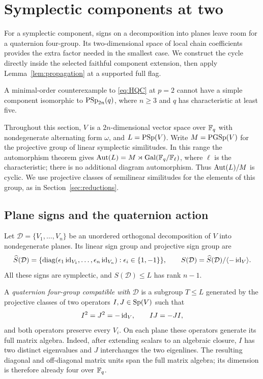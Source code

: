 \section{Symplectic components at two}\label{sec:symplectic}

For a symplectic component, signs on a decomposition into planes leave
room for a quaternion four-group.  Its two-dimensional space of local
chain coefficients provides the extra factor needed in the smallest
case.  We construct the cycle directly inside the selected faithful
component extension, then apply Lemma~\ref{lem:propagation} at a
supported full flag.

\begin{proposition}\label{prop:symplectic}
A minimal-order counterexample to \eqref{eq:HQC} at $p=2$ cannot have a
simple component isomorphic to $\operatorname{PSp}_{2n}(q)$, where $n\geq3$ and $q$
has characteristic at least five.
\end{proposition}

Throughout this section, $V$ is a $2n$-dimensional vector space over
$\mathbb F_q$ with nondegenerate alternating form $\omega$, and
$L=\operatorname{PSp}(V)$.  Write $M=\operatorname{PGSp}(V)$ for the projective group of linear
symplectic similitudes.  In this range the automorphism theorem
\citep[Section~2 and statements~3.2--3.6]{Steinberg1960} gives
$\operatorname{Aut}(L)=M\rtimes\operatorname{Gal}(\mathbb F_q/\mathbb F_\ell)$, where $\ell$ is the
characteristic; there is no additional diagram automorphism.  Thus
$\operatorname{Aut}(L)/M$ is cyclic.  We use projective classes of semilinear
similitudes for the elements of this group, as in
Section~\ref{sec:reductions}.

\subsection{Plane signs and the quaternion action}

Let $\mathcal D=\{V_1,\ldots,V_n\}$ be an unordered orthogonal
decomposition of $V$ into nondegenerate planes.  Its linear sign group
and projective sign group are
\[
\widehat S(\mathcal D)
 =\{\operatorname{diag}(\epsilon_1\operatorname{id}_{V_1},\ldots,
                   \epsilon_n\operatorname{id}_{V_n}):\epsilon_i\in\{1,-1\}\},
\qquad
S(\mathcal D)=\widehat S(\mathcal D)/\langle-\operatorname{id}_V\rangle.
\]
All these signs are symplectic, and $S(\mathcal D)\leq L$ has rank
$n-1$.

A \emph{quaternion four-group compatible with $\mathcal D$} is a
subgroup $T\leq L$ generated by the projective classes of two
operators $I,J\in\operatorname{Sp}(V)$ such that
\begin{equation}\label{eq:symp-quaternion}
I^2=J^2=-\operatorname{id}_V,\qquad IJ=-JI,
\end{equation}
and both operators preserve every $V_i$.  On each plane these
operators generate its full matrix algebra.  Indeed, after extending
scalars to an algebraic closure, $I$ has two distinct eigenvalues and
$J$ interchanges the two eigenlines.  The resulting diagonal and
off-diagonal matrix units span the full matrix algebra; its dimension
is therefore already four over $\mathbb F_q$.

